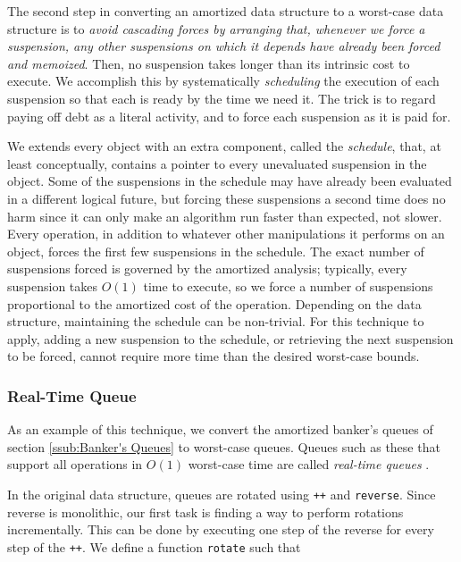 \documentclass[12pt, a4paper]{article} %
\newcommand{\code}[1]{\texttt{#1}} %
\newcommand{\haskell}[1]{\texttt{#1}}
\begin{document}
The second step in converting an amortized data structure to a worst-case data structure is to \textit{avoid cascading forces by arranging that, whenever we force a suspension, any other suspensions on which it depends have already been forced and memoized}. Then, no suspension takes longer than its intrinsic cost to execute. We accomplish this by systematically \textit{scheduling} the execution of each suspension so that each is ready by the time we need it. The trick is to regard paying off debt as a literal activity, and to force each suspension as it is paid for.

We extends every object with an extra component, called the \textit{schedule}, that, at least conceptually, contains a pointer to every unevaluated suspension in the object. Some of the suspensions in the schedule may have already been evaluated in a different logical future, but forcing these suspensions a second time does no harm since it can only make an algorithm run faster than expected, not slower. Every operation, in addition to whatever other manipulations it performs on an object, forces the first few suspensions in the schedule. The exact number of suspensions forced is governed by the amortized analysis; typically, every suspension takes $O(1)$ time to execute, so we force a number of suspensions proportional to the amortized cost of the operation. Depending on the data structure, maintaining the schedule can be non-trivial. For this technique to apply, adding a new suspension to the schedule, or retrieving the next suspension to be forced, cannot require more time than the desired worst-case bounds.

\subsubsection{Real-Time Queue}%
\label{ssub:Real-Time Queue}

As an example of this technique, we convert the amortized banker's queues of section \ref{ssub:Banker's Queues} to worst-case queues. Queues such as these that support all operations in $O(1)$ worst-case time are called \textit{real-time queues} \cite{hm81}.

In the original data structure, queues are rotated using \haskell{++} and \code{reverse}. Since reverse is monolithic, our first task is finding a way to perform rotations incrementally. This can be done by executing one step of the reverse for every step of the \haskell{++}. We define a function \code{rotate} such that
\end{document}
